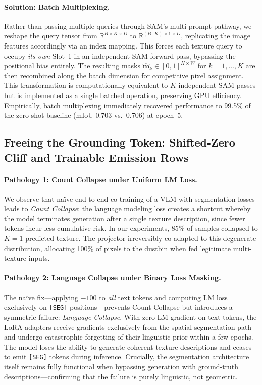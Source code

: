 \documentclass{article}
\begin{document}
\paragraph{Solution: Batch Multiplexing.}
Rather than passing multiple queries through SAM's multi-prompt pathway, we reshape the query tensor from $\mathbb{R}^{B \times K \times D}$ to $\mathbb{R}^{(B \cdot K) \times 1 \times D}$, replicating the image features accordingly via an index mapping. This forces each texture query to occupy \emph{its own} Slot~1 in an independent SAM forward pass, bypassing the positional bias entirely. The resulting masks $\hat{\mathbf{m}}_k \in [0,1]^{H \times W}$ for $k = 1, \ldots, K$ are then recombined along the batch dimension for competitive pixel assignment. This transformation is computationally equivalent to $K$ independent SAM passes but is implemented as a single batched operation, preserving GPU efficiency. Empirically, batch multiplexing immediately recovered performance to 99.5\% of the zero-shot baseline (mIoU 0.703 vs.\ 0.706) at epoch~5.

\subsection{Freeing the Grounding Token: Shifted-Zero Cliff and Trainable Emission Rows}
\label{sec:count_collapse}

\paragraph{Pathology 1: Count Collapse under Uniform LM Loss.}
We observe that na\"ive end-to-end co-training of a VLM with segmentation losses leads to \emph{Count Collapse}: the language modeling loss creates a shortcut whereby the model terminates generation after a single texture description, since fewer tokens incur less cumulative risk. In our experiments, 85\% of samples collapsed to $K{=}1$ predicted texture. The projector irreversibly co-adapted to this degenerate distribution, allocating 100\% of pixels to the dustbin when fed legitimate multi-texture inputs.

\paragraph{Pathology 2: Language Collapse under Binary Loss Masking.}
The na\"ive fix---applying $-100$ to \emph{all} text tokens and computing LM loss exclusively on \texttt{[SEG]} positions---prevents Count Collapse but introduces a symmetric failure: \emph{Language Collapse}. With zero LM gradient on text tokens, the LoRA adapters receive gradients exclusively from the spatial segmentation path and undergo catastrophic forgetting of their linguistic prior within a few epochs. The model loses the ability to generate coherent texture descriptions and ceases to emit \texttt{[SEG]} tokens during inference. Crucially, the segmentation architecture itself remains fully functional when bypassing generation with ground-truth descriptions---confirming that the failure is purely linguistic, not geometric.
\end{document}
